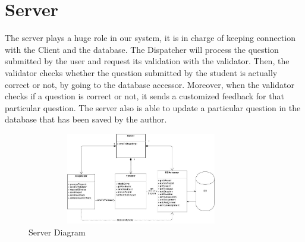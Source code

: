     \chapter{Server}
The server plays a huge role in our system, it is in charge of keeping connection with the Client and the database. The Dispatcher will process the question submitted by the user and request its validation with the validator. Then, the validator checks whether the question submitted by the student is actually correct or not, by going to the database accessor. Moreover, when the validator checks if a question is correct or not, it sends a customized feedback for that particular question.
The server also is able to update a particular question in the database that has been saved by the author. 

                        \begin{figure}[H]
            \centerline{\includegraphics[height=4cm, width=10cm]{Server.jpg}}
            \caption{Server Diagram}
    \end{figure}
    
